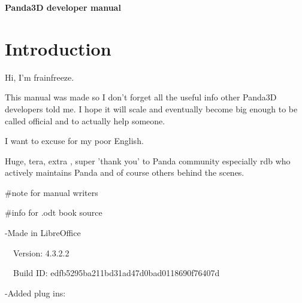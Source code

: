 \documentclass[a4paper]{article}
\title{}
\author{}
\date{2014-11-02}
\begin{document}
\bigskip


\bigskip


\bigskip


\bigskip

{\centering{}\sffamily\bfseries
\hypertarget{RefHeading9801663648339}{}Panda3D developer manual
\par}


\bigskip


\bigskip


\bigskip


\bigskip


\bigskip

\setcounter{tocdepth}{10}
\renewcommand\contentsname{Table of Contents}
\tableofcontents
\section[]{}

\bigskip

\clearpage\section[Introduction]{Introduction}
\hypertarget{RefHeading9821663648339}{}{\color{black}
Hi, I'm frainfreeze.}

{\color{black}
This manual was made so I don't forget all the useful info other Panda3D developers told me.\newline
I hope it will scale and eventually become big enough to be called official and to actually help someone. }

{\color{black}
I want to excuse for my poor English.}

{\color{black}
Huge, tera, extra , super 'thank you' to Panda community especially rdb who actively maintains Panda and of course
others behind the scenes.}


\bigskip


\bigskip


\bigskip


\bigskip

{\color{black}
\#note for manual writers }

{\color{black}
\#info for .odt book source}

{\color{black}
{}-Made in LibreOffice}

{\color{black}
\ \ Version: 4.3.2.2}

{\color{black}
\ \ Build ID: edfb5295ba211bd31ad47d0bad0118690f76407d}

{\color{black}
{}-Added plug ins: }
\end{document}

